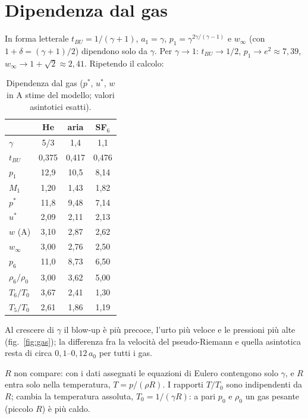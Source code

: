 \section*{Dipendenza dal gas}
In forma letterale $t_{BU}=1/(\gamma+1)$, $a_1=\gamma$, $p_1=\gamma^{2\gamma/(\gamma-1)}$ e $w_\infty$ (con
$1+\delta=(\gamma+1)/2$) dipendono solo da $\gamma$. Per $\gamma\to1$: $t_{BU}\to1/2$, $p_1\to e^2\approx7{,}39$,
$w_\infty\to1+\sqrt2\approx2{,}41$. Ripetendo il calcolo:

\begin{table}[H]
\centering\small
\begin{tabular}{lccc}
\toprule
 & He & aria & SF$_6$ \\
\midrule
$\gamma$ & 5/3 & 1,4 & 1,1 \\
$t_{BU}$ & 0,375 & 0,417 & 0,476 \\
$p_1$ & 12,9 & 10,5 & 8,14 \\
$M_1$ & 1,20 & 1,43 & 1,82 \\
$p^*$ & 11,8 & 9,48 & 7,14 \\
$u^*$ & 2,09 & 2,11 & 2,13 \\
$w$ (A) & 3,10 & 2,87 & 2,62 \\
$w_\infty$ & 3,00 & 2,76 & 2,50 \\
$p_6$ & 11,0 & 8,73 & 6,50 \\
$\rho_6/\rho_0$ & 3,00 & 3,62 & 5,00 \\
$T_6/T_0$ & 3,67 & 2,41 & 1,30 \\
$T_5/T_0$ & 2,61 & 1,86 & 1,19 \\
\bottomrule
\end{tabular}
\caption{Dipendenza dal gas ($p^*$, $u^*$, $w$ in A stime del modello; valori asintotici esatti).}
\end{table}


Al crescere di $\gamma$ il blow-up è più precoce, l'urto più veloce e le pressioni più alte
(fig.~\ref{fig:gas}); la differenza fra la velocità del pseudo-Riemann e quella asintotica resta di circa
$0{,}1$--$0{,}12\,a_0$ per tutti i gas.

$R$ non compare: con i dati assegnati le equazioni di Eulero contengono solo $\gamma$, e $R$ entra solo nella
temperatura, $T=p/(\rho R)$. I rapporti $T/T_0$ sono indipendenti da $R$; cambia la temperatura assoluta,
$T_0=1/(\gamma R)$: a pari $p_0$ e $\rho_0$ un gas pesante (piccolo $R$) è più caldo.

